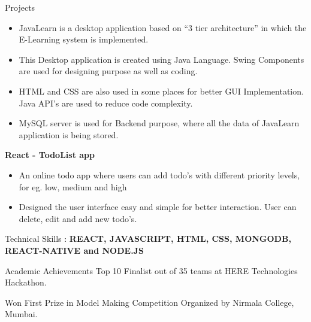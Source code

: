 \documentclass{resume} %
\begin{document}
\begin{rSection}{Projects}
    \begin{itemize}
        \vspace{-0.3cm}\item JavaLearn is a desktop application based on “3 tier architecture” in which the E-Learning system is implemented.
        \vspace{-0.3cm}\item This Desktop application is created using Java Language.
Swing Components are used for designing purpose as well as coding.
        \vspace{-0.3cm}\item HTML and CSS are also used in some places for better GUI Implementation. Java API’s are used to reduce code complexity.
		\vspace{-0.3cm}\item MySQL server is used for Backend purpose, where all the data of JavaLearn application is being stored.
\end{itemize}

{\bf React - TodoList app}
    \begin{itemize}
        \vspace{-0.3cm}\item An online todo app where users can add todo’s with different priority levels, for eg. low, medium and high
        \vspace{-0.3cm}\item Designed the user interface easy and simple for better interaction. User can delete, edit and add new todo’s.
       
    \end{itemize}

\end{rSection}

\begin{rSection}{Technical Skills :}
{\bf REACT, JAVASCRIPT, HTML, CSS, MONGODB, REACT-NATIVE and NODE.JS}

\end{rSection}

\begin{rSection}{Academic Achievements} 
 Top 10 Finalist out of 35 teams at HERE Technologies Hackathon.
\item Won First Prize in Model Making Competition Organized by Nirmala College, Mumbai.
\end{rSection}
\end{document}

